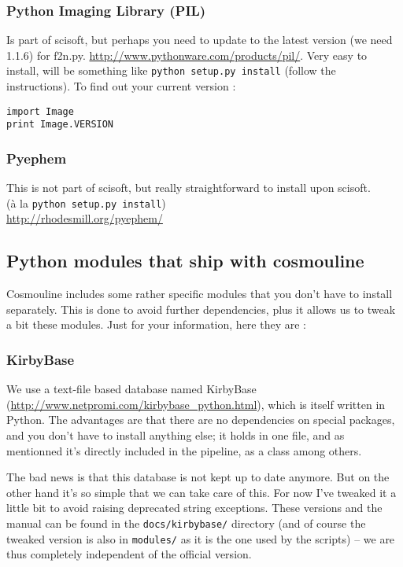 \subsubsection{Python Imaging Library (PIL)}
Is part of scisoft, but perhaps you need to update to the latest version (we need 1.1.6) for f2n.py.
\url{http://www.pythonware.com/products/pil/}. Very easy to install, will be something like \verb+python setup.py install+ (follow the instructions).
To find out your current version :
\begin{lstlisting}
import Image
print Image.VERSION
\end{lstlisting}


\subsubsection{Pyephem}
This is not part of scisoft, but really straightforward to install upon scisoft. \\
(à la \verb+python setup.py install+)\\
\url{http://rhodesmill.org/pyephem/}


\subsection{Python modules that ship with cosmouline}
Cosmouline includes some rather specific modules that you don't have to install separately. This is done to avoid further dependencies, plus it allows us to tweak a bit these modules. Just for your information, here they are :

\subsubsection{KirbyBase}
\label{kirby}
We use a text-file based database named KirbyBase (\url{http://www.netpromi.com/kirbybase_python.html}), which is itself written in Python. The advantages are that there are no dependencies on special packages, and you don't have to install anything else; it holds in one file, and as mentionned it's directly included in the pipeline, as a class among others.

The bad news is that this database is not kept up to date anymore. But on the other hand it's so simple that we can take care of this. For now I've tweaked it a little bit to avoid raising deprecated string exceptions. These versions and the manual can be found in the \verb+docs/kirbybase/+ directory (and of course the tweaked version is also in \verb+modules/+ as it is the one used by the scripts) -- we are thus completely independent of the official version.

